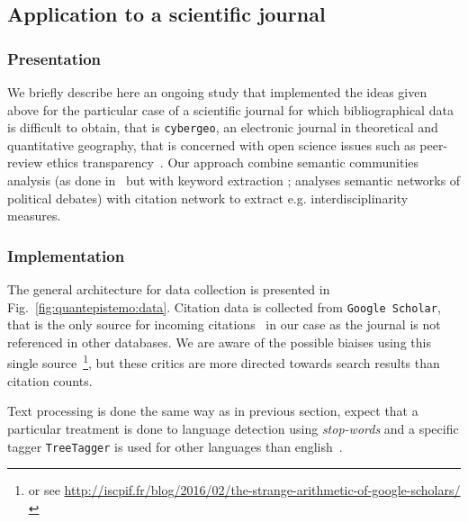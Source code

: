 \subsection{Application to a scientific journal}

\subsubsection{Presentation}

We briefly describe here an ongoing study that implemented the ideas given above for the particular case of a scientific journal for which bibliographical data is difficult to obtain, that is \texttt{cybergeo}, an electronic journal in theoretical and quantitative geography, that is concerned with open science issues such as peer-review ethics transparency~\cite{10.1371/journal.pone.0147913}. Our approach combine semantic communities analysis (as done in~\cite{2016arXiv160208451P} but with keyword extraction ; \cite{2015arXiv151003797G} analyses semantic networks of political debates) with citation network to extract e.g. interdisciplinarity measures.

\subsubsection{Implementation}

The general architecture for data collection is presented in Fig.~\ref{fig:quantepistemo:data}. Citation data is collected from \texttt{Google Scholar}, that is the only source for incoming citations~\cite{noruzi2005google} in our case as the journal is not referenced in other databases. We are aware of the possible biaises using this single source~\cite{bohannon2014scientific}\footnote{or see \url{http://iscpif.fr/blog/2016/02/the-strange-arithmetic-of-google-scholars/}}, but these critics are more directed towards search results than citation counts. 

Text processing is done the same way as in previous section, expect that a particular treatment is done to language detection using \emph{stop-words} and a specific tagger \texttt{TreeTagger} is used for other languages than english~\cite{schmid1994probabilistic}.



